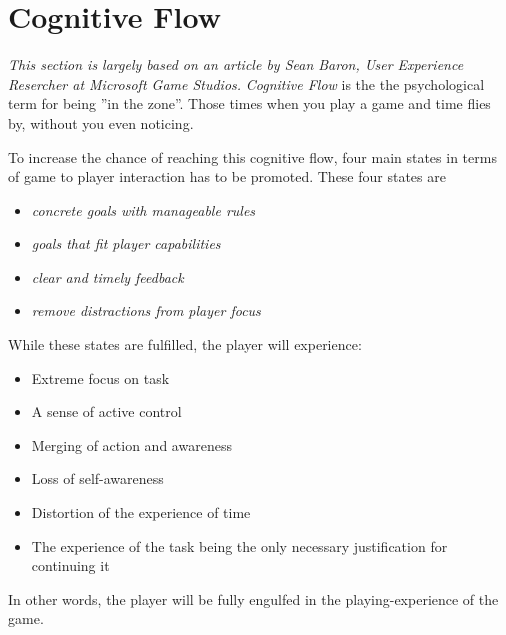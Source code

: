 \section{Cognitive Flow}\label{gamedesign:cognitiveflow}
\emph{This section is largely based on an article by Sean Baron, User Experience Resercher at Microsoft Game Studios\cite{baron}.}
\emph{Cognitive Flow} is the the psychological term for being ''in the zone''. Those times when you play a game and time flies by, without you even noticing. 

To increase the chance of reaching this cognitive flow, four main states in terms of game to player interaction has to be promoted. 
These four states are 
\begin{itemize}
\item \emph{concrete goals with manageable rules}
\item \emph{goals that fit player capabilities}
\item \emph{clear and timely feedback}
\item \emph{remove distractions from player focus}
\end{itemize} While these states are fulfilled, the player will experience:

\begin{itemize}
\item Extreme focus on task
\item A sense of active control
\item Merging of action and awareness
\item Loss of self-awareness
\item Distortion of the experience of time
\item The experience of the task being the only necessary justification for continuing it
\end{itemize}

In other words, the player will be fully engulfed in the playing-experience of the game.

